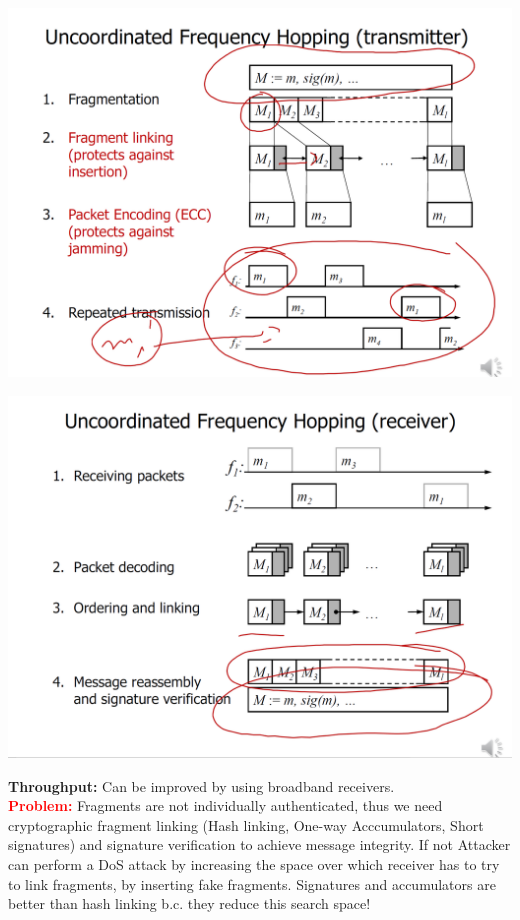 \begin{minipage}{\linewidth}
    \centering      
    \includegraphics[width=\linewidth]{Figures/L3_ufh_sender.PNG} 
\end{minipage}
\begin{minipage}{\linewidth}
    \centering      
    \includegraphics[width=\linewidth]{Figures/L3_ufh_receiver.PNG} 
\end{minipage}
\textbf{Throughput:} Can be improved by using broadband receivers.\\
\textbf{\textcolor{red}{Problem:}} Fragments are not individually authenticated, thus we need cryptographic fragment linking (Hash linking, One-way Acccumulators, Short signatures) and signature verification to achieve message integrity. If not Attacker can perform a DoS attack by increasing the space over which receiver has to try to link fragments, by inserting fake fragments. Signatures and accumulators are better than hash linking b.c. they reduce this search space!

